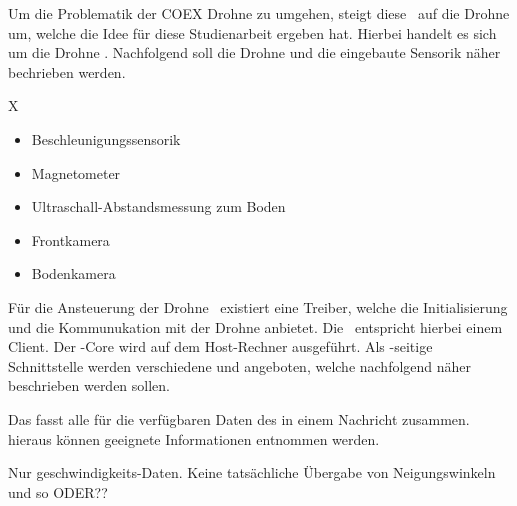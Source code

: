 
Um die Problematik der COEX Drohne zu umgehen, steigt diese \Arbeit\ auf die Drohne um, welche die Idee für diese Studienarbeit ergeben hat.
Hierbei handelt es sich um die Drohne \Ar. Nachfolgend soll die Drohne und die eingebaute Sensorik näher bechrieben werden.





\missing

X


\missing






\begin{itemize}
\item Beschleunigungssensorik
\item Magnetometer
\item Ultraschall-Abstandsmessung zum Boden
\item Frontkamera
\item Bodenkamera
\end{itemize}








Für die Ansteuerung der Drohne \Ar\ existiert eine Treiber, welche die Initialisierung und die Kommunukation mit der Drohne anbietet. Die \Ar\ entspricht hierbei einem Client. Der \ROS-Core wird auf dem Host-Rechner ausgeführt.
Als \ROS-seitige Schnittstelle werden verschiedene \Topic[s] und \Service[s] angeboten, welche nachfolgend näher beschrieben werden sollen.










Das  fasst alle für die verfügbaren Daten des \Quad[s] in einem Nachricht zusammen. hieraus können geeignete Informationen entnommen werden.


Nur geschwindigkeits-Daten. Keine tatsächliche Übergabe von Neigungswinkeln und so ODER??
\missing\








